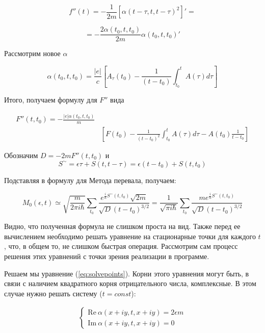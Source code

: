 \documentclass[14pt]{extarticle}
\renewcommand{\Re}{\mathrm{Re}}
\renewcommand{\Im}{\mathrm{Im}}
\renewcommand{\Re}{\mathrm{Re}}
\renewcommand{\Im}{\mathrm{Im}}
\begin{document}
$$
f''(t) = -\frac{1}{2m}\left[\alpha(t-\tau, t, t-\tau)^2\right]' =
$$

$$
= -\frac{2\alpha(t_0, t, t_0)}{2m} \alpha(t_0, t, t_0)'
$$

Рассмотрим новое $\alpha$

$$
\alpha(t_0, t, t_0) = \frac{|e|}{c} \left[A_{\tau}(t_0) - \frac{1}{(t-t_0)}\int_{t_0}^{t}A(\tau) d\tau\right]
$$






Итого, получаем формулу для $F''$ вида

\begin{eqnarray}
	F''(t, t_0) = -\frac{|e|\alpha(t_0, t, t_0)}{m} \nonumber \\
	& \left[F(t_0) - \frac{1}{(t - t_0)^2} \int_{t_0}^{t}A(\tau)d\tau - A(t_0) \frac{1}{t-t_0} \right] \nonumber
\end{eqnarray}


Обозначим $D = - 2 m F''(t, t_0)$ и $$S^\sim = \epsilon \tau + S(t, t-\tau) = \epsilon(t-t_0) + S(t, t_0)$$

Подставляя в формулу для Метода перевала, получаем:

$$
M_0(\epsilon, t) \simeq \sqrt{\frac{m}{2\pi i \hbar}}\sum_{t_0}\frac{e^{\frac{i}{\hbar}S^\sim(t, t_0)} \sqrt{2m}}{\sqrt{D} (t-t_0)^{3/2}} = \frac{1}{\sqrt{\pi i \hbar}}\sum_{t_0}\frac{me^{\frac{i}{\hbar}S^\sim(t, t_0)} }{\sqrt{D} (t-t_0)^{3/2}}
$$

Видно, что полученная формула не слишком проста на вид. Также перед ее вычислением необходимо решать уравнение на стационарные точки для каждого $t$, что, в общем то, не слишком быстрая операция. Рассмотрим сам процесс решения этих уравнений с точки зрения реализации в программе.

Решаем мы уравнение (\ref{eq:solvepoints}). Корни этого уравнения могут быть, в связи с наличием квадратного корня отрицательного числа, комплексные. В этом случае нужно решать систему ($t = const$):

\begin{eqnarray}
\begin{cases}
	\Re \ \alpha(x+i y, t, x+i y) = 2\epsilon m \nonumber\\
	\Im \ \alpha(x+i y, t, x+i y) = 0 \nonumber
\end{cases}
\end{eqnarray}
\end{document}

